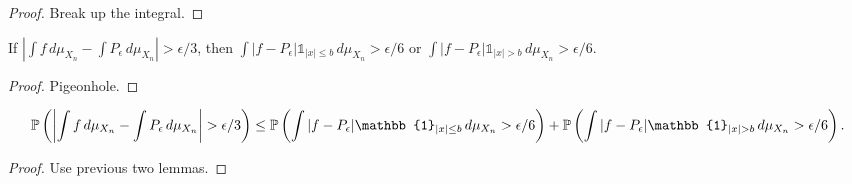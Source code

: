 \begin{proof}
  \notready
  Break up the integral.
\end{proof}


\begin{lemma}
  \label{lem:f_p_epsilon_pigeonhole}
  \uses{}
  \notready
  If $\left|\int f\,d\mu_{X_n} - \int P_\epsilon\,d\mu_{X_n}\right|>\epsilon/3$, then $\int |f-P_\epsilon|\mathbb{1}_{|x|\le b}\,d\mu_{X_n}>\epsilon/6$ or $\int |f-P_\epsilon|\mathbb{1}_{|x|> b}\,d\mu_{X_n}>\epsilon/6$.
  
\end{lemma}

\begin{proof}
  \notready
  Pigeonhole.
\end{proof}


\begin{lemma}
  \label{lem:f_p_epsilon_probability_inequality}
  \notready
  \[
    \bP\left(\left|\int f\,d\mu_{X_n} - \int P_\epsilon\,d\mu_{X_n}\right|>\epsilon/3\right) \le \bP\left(\int |f-P_\epsilon|\mathbb{1}_{|x|\le b}\,d\mu_{X_n}>\epsilon/6\right)
  + \bP\left(\int |f-P_\epsilon|\mathbb{1}_{|x|> b}\,d\mu_{X_n}>\epsilon/6\right).
  \]
  
\end{lemma}

\begin{proof}
  \notready
  Use previous two lemmas.
\end{proof}


